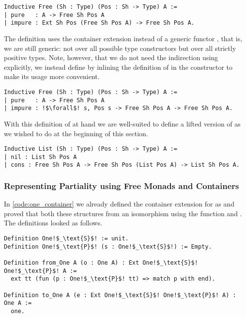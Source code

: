 \begin{verbatim}
Inductive Free (Sh : Type) (Pos : Sh -> Type) A :=
| pure   : A -> Free Sh Pos A
| impure : Ext Sh Pos (Free Sh Pos A) -> Free Sh Pos A.
\end{verbatim}

The definition uses the container extension instead of a generic functor , that is, we are still generic: not over all possible type constructors but over all strictly positive types.
Note, however, that we do not need the indirection using  explicitly, we instead define  by inlining the definition of  in the constructor  to make its usage more convenient.

\begin{verbatim}
Inductive Free (Sh : Type) (Pos : Sh -> Type) A :=
| pure   : A -> Free Sh Pos A
| impure : !$\forall$! s, Pos s -> Free Sh Pos A -> Free Sh Pos A.
\end{verbatim}

With this definition of  at hand we are well\--suited to define a lifted version of  as we wished to do at the beginning of this section.

\begin{verbatim}
Inductive List (Sh : Type) (Pos : Sh -> Type) A :=
| nil : List Sh Pos A
| cons : Free Sh Pos A -> Free Sh Pos (List Pos A) -> List Sh Pos A.
\end{verbatim}

\subsubsection{Representing Partiality using Free Monads and Containers}
\label{subsub:partiality_container}

In \autoref{code:one_container} we already defined the container extension for  as  and proved that both these structures from an isomorphism using the function  and .
The definitions looked as follows.

\begin{verbatim}
Definition One!$_\text{S}$! := unit.
Definition One!$_\text{P}$! (s : One!$_\text{S}$!) := Empty.

Definition from_One A (o : One A) : Ext One!$_\text{S}$! One!$_\text{P}$! A :=
  ext tt (fun (p : One!$_\text{P}$! tt) => match p with end).

Definition to_One A (e : Ext One!$_\text{S}$! One!$_\text{P}$! A) : One A :=
  one.
\end{verbatim}

